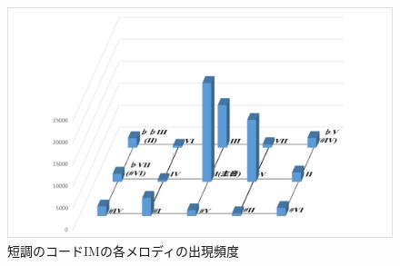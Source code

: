 \begin{figure}[t]
	\begin{center}
		\includegraphics[width=0.8\linewidth]{./pics/05/minorIM.png}
		\caption{短調のコードIMの各メロディの出現頻度}
		\label{img:mIM} 
	\end{center}
\end{figure}